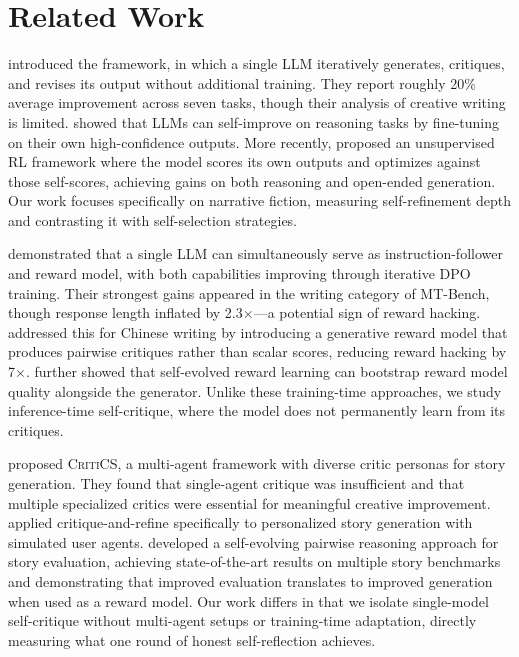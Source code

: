 \section{Related Work}
\label{sec:related}

\citet{madaan2023selfrefine} introduced the \selfrefine framework, in which a single LLM iteratively generates, critiques, and revises its output without additional training.
They report roughly 20\% average improvement across seven tasks, though their analysis of creative writing is limited.
\citet{huang2022selfimprove} showed that LLMs can self-improve on reasoning tasks by fine-tuning on their own high-confidence outputs.
More recently, \citet{zhang2023contemplation} proposed an unsupervised RL framework where the model scores its own outputs and optimizes against those self-scores, achieving gains on both reasoning and open-ended generation.
Our work focuses specifically on narrative fiction, measuring self-refinement depth and contrasting it with self-selection strategies.

\citet{yuan2024selfrewarding} demonstrated that a single LLM can simultaneously serve as instruction-follower and reward model, with both capabilities improving through iterative DPO training.
Their strongest gains appeared in the writing category of MT-Bench, though response length inflated by 2.3$\times$---a potential sign of reward hacking.
\citet{jia2025writingzero} addressed this for Chinese writing by introducing a generative reward model that produces pairwise critiques rather than scalar scores, reducing reward hacking by 7$\times$.
\citet{chen2024selfrewarding} further showed that self-evolved reward learning can bootstrap reward model quality alongside the generator.
Unlike these training-time approaches, we study inference-time self-critique, where the model does not permanently learn from its critiques.

\citet{bae2024critics} proposed \textsc{CritiCS}, a multi-agent framework with diverse critic personas for story generation.
They found that single-agent critique was insufficient and that multiple specialized critics were essential for meaningful creative improvement.
\citet{wu2025prefine} applied critique-and-refine specifically to personalized story generation with simulated user agents.
\citet{chen2025evolvr} developed a self-evolving pairwise reasoning approach for story evaluation, achieving state-of-the-art results on multiple story benchmarks and demonstrating that improved evaluation translates to improved generation when used as a reward model.
Our work differs in that we isolate single-model self-critique without multi-agent setups or training-time adaptation, directly measuring what one round of honest self-reflection achieves.

